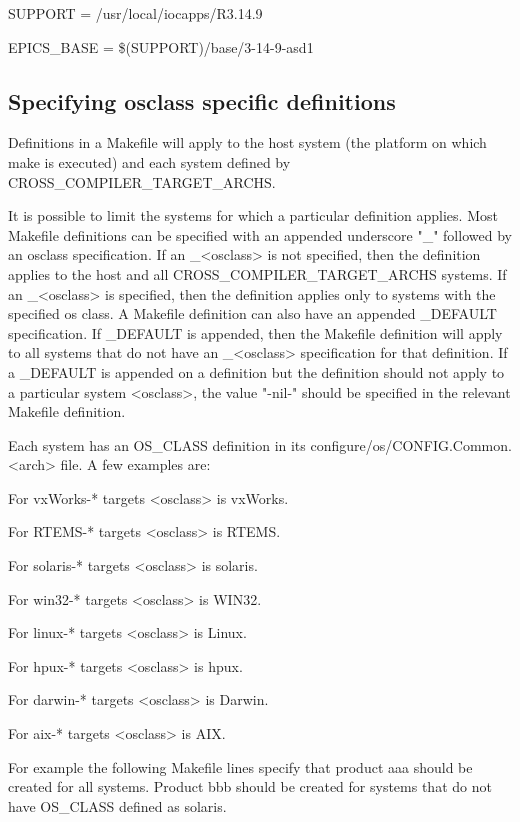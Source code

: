 SUPPORT = /usr/local/iocapps/R3.14.9 

EPICS\_BASE = \$(SUPPORT)/base/3-14-9-asd1

\subsection{Specifying osclass specific definitions}

Definitions in a Makefile will apply to the host system (the platform on which make is executed) and each system defined 
by CROSS\_COMPILER\_TARGET\_ARCHS.

It is possible to limit the systems for which a particular definition applies. Most Makefile definitions can be specified with 
an appended underscore "\_" followed by an osclass specification. If an \_\textless{}osclass\textgreater{} is not specified, then the definition 
applies to the host and all CROSS\_COMPILER\_TARGET\_ARCHS systems. If an \_\textless{}osclass\textgreater{} is specified, then the 
definition applies only to systems with the specified os class. A Makefile definition can also have an appended 
\_DEFAULT specification. If \_DEFAULT is appended, then the Makefile definition will apply to all systems that do not 
have an \_\textless{}osclass\textgreater{} specification for that definition. If a \_DEFAULT is appended on a definition but the definition should 
not apply to a particular system \textless{}osclass\textgreater{}, the value "-nil-" should be specified in the relevant Makefile definition.

Each system has an OS\_CLASS definition in its configure/os/CONFIG.Common.\textless{}arch\textgreater{} file. A few examples are:

\begin{description}\item For vxWorks-* targets \textless{}osclass\textgreater{} is vxWorks.

\item For RTEMS-* targets \textless{}osclass\textgreater{} is RTEMS.

\item For solaris-* targets \textless{}osclass\textgreater{} is solaris.

\item For win32-* targets \textless{}osclass\textgreater{} is WIN32.

\item For linux-* targets \textless{}osclass\textgreater{} is Linux.

\item For hpux-* targets \textless{}osclass\textgreater{} is hpux.

\item For darwin-* targets \textless{}osclass\textgreater{} is Darwin.

\item For aix-* targets \textless{}osclass\textgreater{} is AIX.

\end{description}For example the following Makefile lines specify that product aaa should be created for all systems. Product bbb should 
be created for systems that do not have OS\_CLASS defined as solaris.

